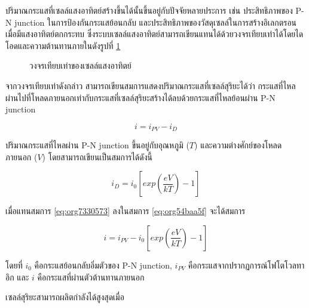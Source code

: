 \documentclass[a4paper,nobib,openany]{tufte-book}
\begin{document}
ปริมาณกระแสที่เซลล์แสงอาทิตย์สร้างขึ้นได้นั้นขึ้นอยู่กับปัจจัยหลายประการ
เช่น ประสิทธิภาพของ P-N junction ในการป้องกันกระแสย้อนกลับ
และประสิทธิภาพของวัสดุเซลล์ในการสร้างอิเลกตรอนเมื่อมีแสงอาทิตย์ตกกระทบ
ซึ่งระบบเซลล์แสงอาทิตย์สามารถเขียนแทนได้ด้วยวงจรเทียบเท่าได้โดยไดโอดและความต้านทานภายในดังรูปที่ \ref{fig: equiv circuit solar cell}


\begin{figure}[h]
  \centering
\caption{\label{fig: equiv circuit solar cell}วงจรเทียบเท่าของเซลล์แสงอาทิตย์}
\end{figure}

จากวงจรเทียบเท่าดังกล่าว
สามารถเขียนสมการแสดงปริมาณกระแสที่เซลล์สุริยะได้ว่า
กระแสที่ไหลผ่านไปที่โหลดภายนอกเท่ากับกระแสที่เซลล์สุริยะสร้างได้ลบด้วยกระแสที่ไหลย้อนผ่าน
P-N junction

\begin{equation}
\label{eq:org54baa5f}
  i = i_{PV} - i_D
\end{equation}

ปริมาณกระแสที่ไหลผ่าน P-N junction ขึ้นอยู่กับอุณหภูมิ (\(T\))
และความต่างศักย์ของโหลดภายนอก (\(V\)) โดยสามารถเขียนเป็นสมการได้ดังนี้

\begin{equation}
\label{eq:org7330573}
  i_D = i_0 \left[ exp \left( \frac{eV}{kT} \right) - 1 \right]
\end{equation}

เมื่อแทนสมการ \ref{eq:org7330573} ลงในสมการ
\ref{eq:org54baa5f} จะได้สมการ

\begin{equation}
\label{eq:org4e9b422}
  i = i_{PV} - i_0\left[exp \left( \frac{eV}{kT} \right) - 1 \right]
\end{equation}

โดยที่ \(i_0\) คือกระแสย้อนกลับอิ่มตัวของ P-N junction, \(i_{PV}\)
คือกระแสจากปรากฏการณ์โฟโตโวลทาอิก และ \(i\)
คือกระแสที่ผ่านตัวต้านทานภายนอก

เซลล์สุริยะสามารถผลิตกำลังได้สูงสุดเมื่อ
\end{document}
